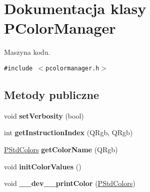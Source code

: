 \hypertarget{classPColorManager}{
\section{Dokumentacja klasy PColorManager}
\label{classPColorManager}
}
Maszyna kodu.  


{\tt \#include $<$pcolormanager.h$>$}

\subsection*{Metody publiczne}
\begin{CompactItemize}
\item 
\hypertarget{classPColorManager_ee267bb2056457f73dcf1115e7d3c973}{
void \textbf{setVerbosity} (bool)}
\label{classPColorManager_ee267bb2056457f73dcf1115e7d3c973}

\item 
\hypertarget{classPColorManager_36a84d6e85c87edf65fdb511690ed434}{
int \textbf{getInstructionIndex} (QRgb, QRgb)}
\label{classPColorManager_36a84d6e85c87edf65fdb511690ed434}

\item 
\hypertarget{classPColorManager_27aeb6623eaf527db2d7428ab038958c}{
\hyperlink{penums_8h_4fb01e50a2da85245f7cea7856eca8ec}{PStdColors} \textbf{getColorName} (QRgb)}
\label{classPColorManager_27aeb6623eaf527db2d7428ab038958c}

\item 
\hypertarget{classPColorManager_e9793e8da1800653b11609376098695c}{
void \textbf{initColorValues} ()}
\label{classPColorManager_e9793e8da1800653b11609376098695c}

\item 
\hypertarget{classPColorManager_83e07cad55aed7d9133e42a71d514d26}{
void \textbf{\_\-\_\-dev\_\-\_\-printColor} (\hyperlink{penums_8h_4fb01e50a2da85245f7cea7856eca8ec}{PStdColors})}
\label{classPColorManager_83e07cad55aed7d9133e42a71d514d26}

\end{CompactItemize}
